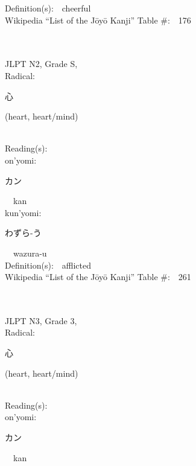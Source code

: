 \begin{multicols}{2}
Definition(s):\ \ cheerful \\
Wikipedia ``List of the J\=oy\=o Kanji'' Table \#:\ \ 176 \\
\ \ \\
{\fontsize{34pt}{40pt}  }\ \ \\  %
{JLPT N2, Grade S, \\Radical:\ \ {\begin{CJK}{UTF8}{min} 心 \end{CJK}} (heart, heart/mind) } \\
Reading(s):\ \ \\
{\hspace*{1em}}on'yomi:\ \ \\
{\hspace*{2em}}{\begin{CJK}{UTF8}{min} カン \end{CJK}}\ \ kan\ \ \\
{\hspace*{1em}}kun'yomi:\ \ \\
{\hspace*{2em}}{\begin{CJK}{UTF8}{min} わずら-う \end{CJK}}\ \ wazura-u\ \ \\
Definition(s):\ \ afflicted \\
Wikipedia ``List of the J\=oy\=o Kanji'' Table \#:\ \ 261 \\
\ \ \\
{\fontsize{34pt}{40pt}  }\ \ \\  %
{JLPT N3, Grade 3, \\Radical:\ \ {\begin{CJK}{UTF8}{min} 心 \end{CJK}} (heart, heart/mind) } \\
Reading(s):\ \ \\
{\hspace*{1em}}on'yomi:\ \ \\
{\hspace*{2em}}{\begin{CJK}{UTF8}{min} カン \end{CJK}}\ \ kan\ \ \\

\end{multicols}
